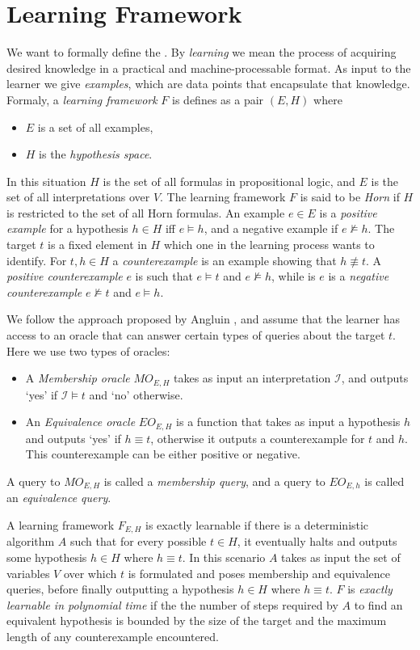 \section{Learning Framework}
We want to formally define the . By \emph{learning} we mean the process of acquiring desired knowledge in a practical and machine-processable format. As input to the learner we give \emph{examples}, which are data points that encapsulate that knowledge. Formaly, a \emph{learning framework} $F$ is defines as a pair $(E, H)$ where
\begin{itemize}
    \item $E$ is a set of all examples,
    \item $H$ is the \emph{hypothesis space}.
\end{itemize}
In this situation $H$ is the set of all formulas in propositional logic, and $E$ is the set of all interpretations over $V$. The learning framework $F$ is said to be \emph{Horn} if $H$ is restricted to the set of all Horn formulas. An example $e \in E$ is a \emph{positive example} for a hypothesis $h \in H$ iff $e \models h$, and a negative example if $e \not \models h$. The target $t$ is a fixed element in $H$ which one in the learning process wants to identify. For $t, h \in H$ a \emph{counterexample} is an example showing that $h \not \equiv t$. A \emph{positive counterexample} $e$ is such that $e \models t$ and $e \not \models h$, while is $e$ is a \emph{negative counterexample} $e\not \models t$ and $e \models h$.

We follow the approach proposed by Angluin \cite{DBLP:journals/ml/AngluinFP92}, and assume that the learner has access to an oracle that can answer certain types of queries about the target $t$. Here we use two types of oracles:
\begin{itemize}
    \item A \emph{Membership oracle} $MO_{E, H}$ takes as input an interpretation $\mathcal{I}$, and outputs `yes' if $\mathcal{I} \models t$ and `no' otherwise.
    \item An \emph{Equivalence oracle} $EO_{E,H}$ is a function that takes as input a hypothesis $h$ and outputs `yes' if $h \equiv t$, otherwise it outputs a counterexample for $t$ and $h$. This counterexample can be either positive or negative.
\end{itemize}
A query to $MO_{E, H}$ is called a \emph{membership query}, and a query to $EO_{E, h}$ is called an \emph{equivalence query}.

A learning framework $F_{E, H}$ is exactly learnable if there is a deterministic algorithm $A$ such that for every possible $t\in H$, it eventually halts and outputs some hypothesis $h \in H$ where $h \equiv t$. In this scenario $A$ takes as input the set of variables $V$ over which $t$ is formulated and poses membership and equivalence queries, before finally outputting a hypothesis $h \in H$ where $h \equiv t$. $F$ is \emph{exactly learnable in polynomial time} if the the number of steps required by $A$ to find an equivalent hypothesis is bounded by the size of the target and the maximum length of any counterexample encountered.


